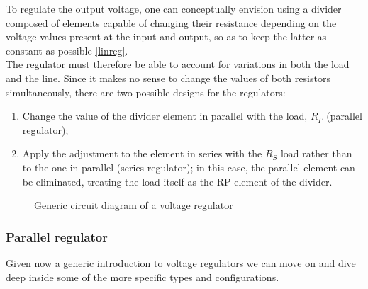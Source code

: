 \documentclass[../main.tex]{subfiles}
\begin{document}
To regulate the output voltage, one can conceptually envision using a divider composed of elements capable of changing their resistance depending on the voltage values present at the input and output, so as to keep the latter as constant as possible \autoref{linreg}.\\

The regulator must therefore be able to account for variations in both the load and the line. Since it makes no sense to change the values of both resistors simultaneously, there are two possible designs for the regulators:

\begin{enumerate}[label=\textbf{-}]
	\item Change the value of the divider element in parallel with the load, $R_P$ (parallel regulator);
	\item Apply the adjustment to the element in series with the $R_S$ load rather than to the one in parallel (series regulator); in this case, the parallel element can be eliminated, treating the load itself as the RP element of the divider.
\end{enumerate}




\begin{figure}[h!]
\begin{center}


\label{linreg}
\caption{Generic circuit diagram of a voltage regulator}	
\end{center}	
\end{figure}



\subsubsection{Parallel regulator}

Given now a generic introduction to voltage regulators we can move on and dive deep inside some of the more specific types and configurations.\\
\end{document}
